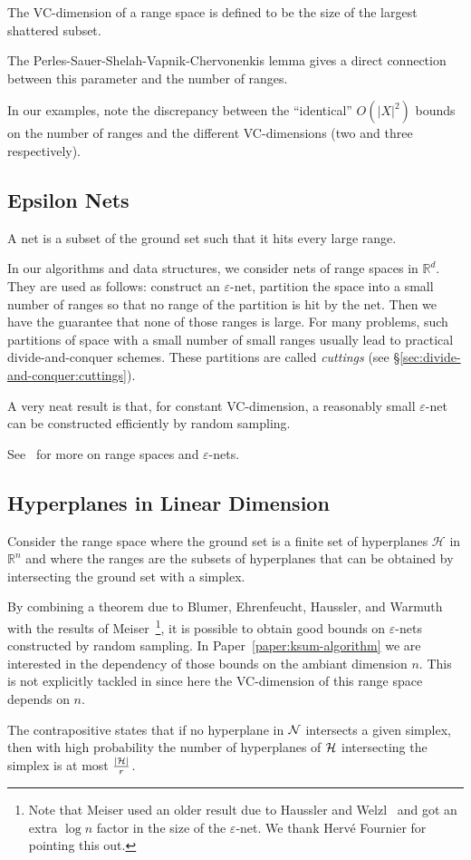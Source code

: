 The VC-dimension of a range space is defined to be the size of the largest
shattered subset.


The Perles-Sauer-Shelah-Vapnik-Chervonenkis lemma gives a direct connection
between this parameter and the number of ranges.
%

%
In our examples, note the discrepancy between the ``identical''
\(O({|X|}^2)\) bounds on the number of ranges and the different VC-dimensions
(two and three respectively).

\subsection{Epsilon Nets}
\label{sec:divide-and-conquer:epsilon-nets}

A net is a subset of the ground set such that it hits every large range.
%

%
In our algorithms and data structures,
%
we consider nets of range spaces in \(\mathbb{R}^d\).
They are used as follows: construct an \(\varepsilon\)-net,
partition the space into a small number of ranges so that no range of the
partition is hit by the net. Then we have the guarantee that none of those
ranges is large.
%
For many problems,
such partitions of space with a small number of
small ranges usually lead to practical divide-and-conquer schemes.
These partitions are called \emph{cuttings} (see
\S\ref{sec:divide-and-conquer:cuttings}).

A very neat result is that, for constant VC-dimension, a reasonably small
\(\varepsilon\)-net can be constructed efficiently by random sampling.


See~\cite[Section~40.4]{CMR04} for more on range spaces and \(\varepsilon\)-nets.

\subsection{Hyperplanes in Linear Dimension}

Consider the range space where the ground set is a finite set of hyperplanes
\(\mathcal{H}\) in \(\mathbb{R}^n\)
and where the ranges are the subsets of hyperplanes that can be obtained by
intersecting the ground set with a simplex.

By combining a theorem due to
Blumer,
Ehrenfeucht,
Haussler, and
Warmuth~\cite{BEHW89}
with the results of Meiser~\cite{Mei93}\footnote{Note that
Meiser used an older result due to Haussler and Welzl~\cite{H87} and got an
extra $\log n$ factor in the size of the $\varepsilon$-net. We thank Hervé
Fournier for pointing this out.}, it is possible to
obtain good bounds on \(\varepsilon\)-nets constructed by
random sampling.
%
In Paper~\ref{paper:ksum-algorithm}
we are interested in the dependency of those bounds on the ambiant dimension
\(n\).
This is not explicitly tackled in 
since here the VC-dimension of this range space depends on \(n\).
%

%
The contrapositive states that if no hyperplane in \(\mathcal{N}\) intersects
a given simplex, then with high probability the number of hyperplanes of
\(\mathcal{H}\) intersecting the simplex is at most \(\frac{| \mathcal{H} |}{r}\).


